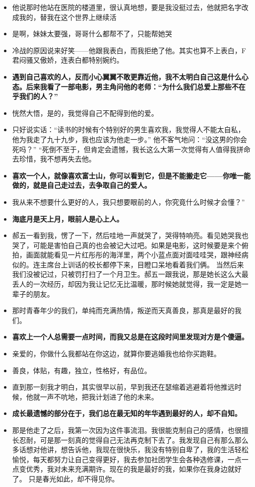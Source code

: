 \documentclass[UTF8,a4paper,8pt]{ctexart}
\begin{document}
\begin{itemize}
 	\item 他说那时他站在医院的楼道里，很认真地想，要是我没挺过去，他就把名字改成我的，替我在这个世界上继续活
 	\item 是啊，妹妹太要强，哥哥什么都帮不了，只能帮她哭
 	\item 冷战的原因说来好笑——他跟我表白，而我拒绝了他。其实也算不上表白，F君闷骚又傲娇，连表白都特别婉约。
 	\item \textbf{遇到自己喜欢的人，反而小心翼翼不敢更靠近他，我不太明白自己这是什么心态。后来我看了一部电影，男主角问他的老师：“为什么我们总爱上那些不在乎我们的人？”}
 	\item 恍然大悟，是的，我觉得自己不配得到他的爱。
 	\item 只好说实话：“读书的时候有个特别好的男生喜欢我，我觉得人不能太自私，他为我走了九十九步，我也应该为他走一步。” 他不客气地问：“没这男的你会死吗？” “死倒不至于，但肯定会遗憾，我长这么大第一次觉得有人值得我拼命去珍惜，我不想再失去他。
 	\item \textbf{喜欢一个人，就像喜欢富士山，你可以看到它，但是不能搬走它——你唯一能做的，就是自己走过去，去争取自己的爱人。}
 	\item 我从来不想要什么更好的人，我只想要眼前的人，你究竟什么时候才会懂？”
 	\item \textbf{海底月是天上月，眼前人是心上人。}
 	\item 郝五一看到我，愣了一下，然后哇地一声就哭了，哭得特响亮。看见她哭我也哭了，可能是害怕自己真的也会被记大过吧。如果是电影，这时候要是来个俯拍，画面就能看见一片红彤彤的海洋里，两个小蓝点面对面哇哇哭，跟神经病似的。连主席台上训话的校长都停下来，目瞪口呆地看着我们俩。 当然后来我们没被记过，只被罚打扫了一个月卫生。郝五一跟我说，那是她长这么大最丢人的一次经历，却因为我让记忆无比温暖，那时候她就觉得，我一定是她一辈子的朋友。
 	\item 那时青春年少的我们，单纯而充满热情，叛逆而天真善良，那真是最好的我们。
 	\item \textbf{喜欢上一个人总需要一点时间，而我又总是在这段时间里发现对方是个傻逼。}
 	\item 亲爱的，你做什么我都站在你这边，就算你要逃婚我也给你买跑鞋。
 	\item 善良，体贴，有趣，独立，性格好，有品位。
 	\item 直到那一刻我才明白，其实很早以前，早到我还在瑟缩着逃避着将他推远时候，他就一声不吭地，把我计划进了他的未来。
 	\item \textbf{成长最遗憾的部分在于，我们总在最无知的年华遇到最好的人，却不自知。}
 	\item 那是他走了之后，我第一次因为这件事流泪。我很能克制自己的感情，也很擅长忍耐，可是那一刻真的觉得自己无法再克制下去了。我发现自己有那么那么多话想对他讲，想告诉他，我现在很快乐，我没有特别自卑了，我的生活轻松愉悦，每天都努力让自己变得更好，我去参加社团学生会各种选修课，一点一点变优秀，我对未来充满期许。现在的我是最好的我，如果你在我身边就好了。 只是春光如此，却不得见你。

\end{itemize}
\end{document}
